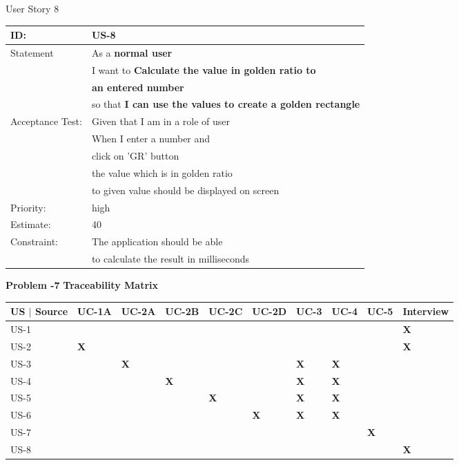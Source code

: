 \documentclass[12pt,a4paper]{article}
\begin{document}
\newpage
User Story 8
\begin{table}[h]
\centering
\begin{tabular}{|l|l|}
\hline
ID: & US-8 \\
\hline
Statement & As a \textbf{normal user} \\& I want to \textbf{Calculate the value in golden ratio to} \\ & \textbf{an entered number}\\
& so that \textbf{ I can use the values to create a golden rectangle }\\
\hline
Acceptance Test: & Given that I am in a role of user\\
& When I enter a number and \\& click on 'GR' button\\ & the value which is in golden ratio \\ &to given value should be displayed on screen\\
\hline
Priority: & high \\
\hline
Estimate: & 40\\
\hline
Constraint:  & The application should be able  \\& to calculate the result in milliseconds\\
\hline
\end{tabular}
\end{table}
\newpage
\textbf{Problem -7}
\textbf{Traceability Matrix}
\begin{table}[h]
\centering
\begin{tabular}{|l|l|l|l|l|l|l|l|l|l|}
\hline
US $|$ Source & UC-1A &  UC-2A &  UC-2B &  
UC-2C &  UC-2D & UC-3 & UC-4 & UC-5 & Interview \\
\hline
US-1 & & & & & & & & & \textbf{X}\\
\hline
US-2 & \textbf{X} & & & & & & & & \textbf{X} \\
\hline
US-3 & & \textbf{X}& & & & \textbf{X}&\textbf{X} & & \\
\hline
US-4 & & & \textbf{X}& & &\textbf{X} &\textbf{X} & & \\
\hline
US-5 & & & & \textbf{X}&  & \textbf{X}&\textbf{X} & & \\
\hline
US-6 & & & & & \textbf{X}& \textbf{X} &\textbf{X} & & \\
\hline
US-7 & & & & & & & & \textbf{X} & \\
\hline
US-8 & & & & & & & & & \textbf{X}\\
\hline
\end{tabular}
\end{table}
\end{document}
